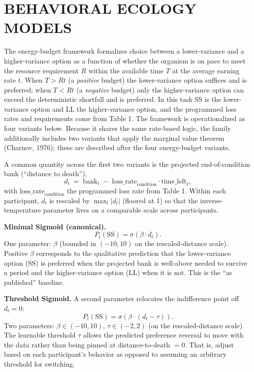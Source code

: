 \documentclass[12pt]{article}
\begin{document}
\section*{BEHAVIORAL ECOLOGY MODELS}

\indent The energy-budget framework formalizes choice between a lower-variance and a higher-variance option as a function of whether the organism is on pace to meet the resource requirement $R$ within the available time $T$ at the average earning rate $t$. When $T > Rt$ (a \textit{positive} budget) the lower-variance option suffices and is preferred; when $T < Rt$ (a \textit{negative} budget) only the higher-variance option can exceed the deterministic shortfall and is preferred. In this task SS is the lower-variance option and LL the higher-variance option, and the programmed loss rates and requirements come from Table 1. The framework is operationalized as four variants below. Because it shares the same rate-based logic, the family additionally includes two variants that apply the marginal value theorem (Charnov, 1976); these are described after the four energy-budget variants.

A common quantity across the first two variants is the projected end-of-condition bank (``distance to death''),
\[
d_t \;=\; \mathrm{bank}_t \;-\; \mathrm{loss\_rate}_{\text{condition}} \cdot \mathrm{time\_left}_t,
\]
with $\mathrm{loss\_rate}_{\text{condition}}$ the programmed loss rate from Table 1. Within each participant, $d_t$ is rescaled by $\max_t |d_t|$ (floored at 1) so that the inverse-temperature parameter lives on a comparable scale across participants.

\textbf{Minimal Sigmoid (canonical).}
\[
P_t(\mathrm{SS}) = \sigma(\beta \cdot d_t).
\]
One parameter: $\beta$ (bounded in $(-10, 10)$ on the rescaled-distance scale). Positive $\beta$ corresponds to the qualitative prediction that the lower-variance option (SS) is preferred when the projected bank is well-above needed to survive a period and the higher-variance option (LL) when it is not. This is the ``as published'' baseline.

\textbf{Threshold Sigmoid.} A second parameter relocates the indifference point off $d_t = 0$:
\[
P_t(\mathrm{SS}) = \sigma\!\left( \beta \cdot (d_t - \tau) \right).
\]
Two parameters: $\beta \in (-10, 10)$, $\tau \in (-2, 2)$ (on the rescaled-distance scale). The learnable threshold $\tau$ allows the predicted preference reversal to move with the data rather than being pinned at distance-to-death $= 0$. That is, adjust based on each participant's behavior as opposed to assuming an arbitrary threshold for switching.
\end{document}
